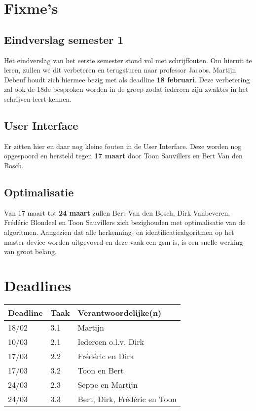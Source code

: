 \documentclass[a4paper,11pt]{article}
\begin{document}
\section{Fixme's}
\subsection{Eindverslag semester 1}
Het eindverslag van het eerste semester stond vol met schrijffouten. Om hieruit te leren, zullen we dit verbeteren en terugsturen naar professor Jacobs. Martijn Debeuf houdt zich hiermee bezig met als deadline {\bf 18 februari}. Deze verbetering zal ook de 18de besproken worden in de groep zodat iedereen zijn zwaktes in het schrijven leert kennen.

\subsection{User Interface}
Er zitten hier en daar nog kleine fouten in de User Interface. Deze worden nog opgespoord en hersteld tegen {\bf 17 maart} door Toon Sauvillers en Bert Van den Bosch.

\subsection {Optimalisatie}
Van 17 maart tot {\bf 24 maart} zullen Bert Van den Bosch, Dirk Vanbeveren, Frédéric Blondeel en Toon Sauvillers zich bezighouden met optimalisatie van de algoritmen. Aangezien dat alle herkenning- en identificatiealgoritmen op het master device worden uitgevoerd en deze vaak een gsm is, is een snelle werking van groot belang.

\section{Deadlines}
\begin{tabular}{| l | l | l |}
\hline
Deadline & Taak & Verantwoordelijke(n) \\
\hline
18/02 & 3.1 & Martijn \\
10/03 & 2.1 & Iedereen o.l.v. Dirk \\
17/03 & 2.2 & Frédéric en Dirk \\
17/03 & 3.2 & Toon en Bert \\
24/03 & 2.3 & Seppe en Martijn \\
24/03 & 3.3 & Bert, Dirk, Frédéric en Toon \\
\hline
\end{tabular}
\end{document}
